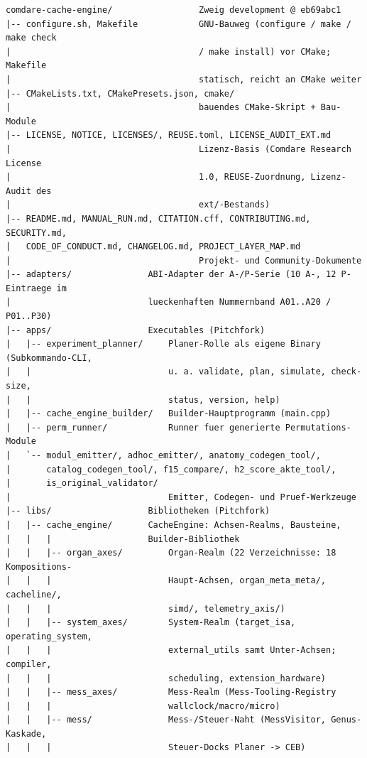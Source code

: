 {\footnotesize
\begin{verbatim}
comdare-cache-engine/                 Zweig development @ eb69abc1
|-- configure.sh, Makefile            GNU-Bauweg (configure / make / make check
|                                     / make install) vor CMake; Makefile
|                                     statisch, reicht an CMake weiter
|-- CMakeLists.txt, CMakePresets.json, cmake/
|                                     bauendes CMake-Skript + Bau-Module
|-- LICENSE, NOTICE, LICENSES/, REUSE.toml, LICENSE_AUDIT_EXT.md
|                                     Lizenz-Basis (Comdare Research License
|                                     1.0, REUSE-Zuordnung, Lizenz-Audit des
|                                     ext/-Bestands)
|-- README.md, MANUAL_RUN.md, CITATION.cff, CONTRIBUTING.md, SECURITY.md,
|   CODE_OF_CONDUCT.md, CHANGELOG.md, PROJECT_LAYER_MAP.md
|                                     Projekt- und Community-Dokumente
|-- adapters/               ABI-Adapter der A-/P-Serie (10 A-, 12 P-Eintraege im
|                           lueckenhaften Nummernband A01..A20 / P01..P30)
|-- apps/                   Executables (Pitchfork)
|   |-- experiment_planner/     Planer-Rolle als eigene Binary (Subkommando-CLI,
|   |                           u. a. validate, plan, simulate, check-size,
|   |                           status, version, help)
|   |-- cache_engine_builder/   Builder-Hauptprogramm (main.cpp)
|   |-- perm_runner/            Runner fuer generierte Permutations-Module
|   `-- modul_emitter/, adhoc_emitter/, anatomy_codegen_tool/,
|       catalog_codegen_tool/, f15_compare/, h2_score_akte_tool/,
|       is_original_validator/
|                               Emitter, Codegen- und Pruef-Werkzeuge
|-- libs/                   Bibliotheken (Pitchfork)
|   |-- cache_engine/       CacheEngine: Achsen-Realms, Bausteine,
|   |   |                   Builder-Bibliothek
|   |   |-- organ_axes/         Organ-Realm (22 Verzeichnisse: 18 Kompositions-
|   |   |                       Haupt-Achsen, organ_meta_meta/, cacheline/,
|   |   |                       simd/, telemetry_axis/)
|   |   |-- system_axes/        System-Realm (target_isa, operating_system,
|   |   |                       external_utils samt Unter-Achsen; compiler,
|   |   |                       scheduling, extension_hardware)
|   |   |-- mess_axes/          Mess-Realm (Mess-Tooling-Registry
|   |   |                       wallclock/macro/micro)
|   |   |-- mess/               Mess-/Steuer-Naht (MessVisitor, Genus-Kaskade,
|   |   |                       Steuer-Docks Planer -> CEB)

\end{verbatim}}
